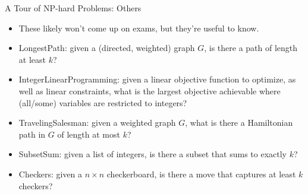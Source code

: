 \documentclass{beamer}
\begin{document}
\begin{frame}[t]{A Tour of NP-hard Problems: Others}
    \begin{itemize}
        \item These likely won't come up on exams, but they're useful to know.
        \item \pause \alert{LongestPath}: given a (directed, weighted) graph $G$, is there a path of length at least $k$?
        \item \pause \alert{IntegerLinearProgramming}: given a linear objective function to optimize, as well as linear constraints, what is the largest objective achievable where (all/some) variables are restricted to integers?
        \item \pause \alert{TravelingSalesman}: given a weighted graph $G$, what is there a Hamiltonian path in $G$ of length at most $k$?
        \item \pause \alert{SubsetSum}: given a list of integers, is there a subset that sums to exactly $k$?
        \item \pause \alert{Checkers}: given a $n \times n$ checkerboard, is there a move that captures at least $k$ checkers?
    \end{itemize}
\end{frame}
\end{document}
